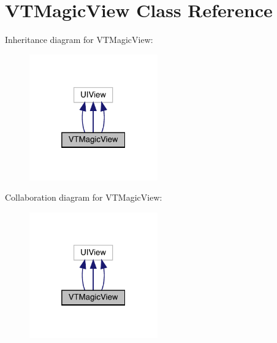 \hypertarget{interface_v_t_magic_view}{}\section{V\+T\+Magic\+View Class Reference}
\label{interface_v_t_magic_view}


Inheritance diagram for V\+T\+Magic\+View\+:\nopagebreak
\begin{figure}[H]
\begin{center}
\leavevmode
\includegraphics[width=157pt]{interface_v_t_magic_view__inherit__graph}
\end{center}
\end{figure}


Collaboration diagram for V\+T\+Magic\+View\+:\nopagebreak
\begin{figure}[H]
\begin{center}
\leavevmode
\includegraphics[width=157pt]{interface_v_t_magic_view__coll__graph}
\end{center}
\end{figure}
